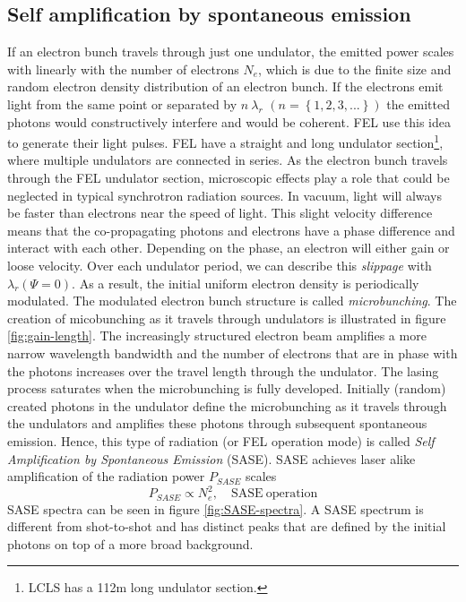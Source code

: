 \subsection{Self amplification by spontaneous emission}\label{sec:sase}
If an electron bunch travels through just one undulator, the emitted power scales with linearly with the number of electrons $N_{e}$, which is due to the finite size and random electron density distribution of an electron bunch. If the electrons emit light from the same point or separated by $n\ \lambda_{r}$ $\left(n=\left\{1,2,3,...\right\}\right)$ the emitted photons would constructively interfere and would be coherent. FEL use this idea to generate their light pulses. FEL have a straight and long undulator section\footnote{LCLS has a 112m long undulator section.}, where multiple undulators are connected in series. As the electron bunch travels through the FEL undulator section, microscopic effects play a role that could be neglected in typical synchrotron radiation sources. In vacuum, light will always be faster than electrons near the speed of light. This slight velocity difference means that the co-propagating photons and electrons have a phase difference and interact with each other. Depending on the phase, an electron will either gain or loose velocity. Over each undulator period, we can describe this \textit{slippage} with $\lambda_{r}(\Psi = 0)$. As a result, the initial uniform electron density is periodically modulated. The modulated electron bunch structure is called \textit{microbunching}. The creation of micobunching as it travels through undulators is illustrated in figure \ref{fig:gain-length}. The increasingly structured electron beam amplifies a more narrow wavelength bandwidth and the number of electrons that are in phase with the photons increases over the travel length through the undulator. The lasing process saturates when the microbunching is fully developed. Initially (random) created photons in the undulator define the microbunching as it travels through the undulators and amplifies these photons through subsequent spontaneous emission. Hence, this type of radiation (or FEL operation mode) is called \textit{Self Amplification by Spontaneous Emission} (SASE). SASE achieves laser alike amplification of the radiation power $P_{SASE}$ scales \citep[see][p.~61]{Als-Nielson-2011-JWS}
\begin{equation}
P_{SASE} \propto N_{e}^{2},\quad \mathrm{SASE\ operation}
\end{equation}
SASE spectra can be seen in figure \ref{fig:SASE-spectra}. A SASE spectrum is different from shot-to-shot and has distinct peaks that are defined by the initial photons on top of a more broad background.
